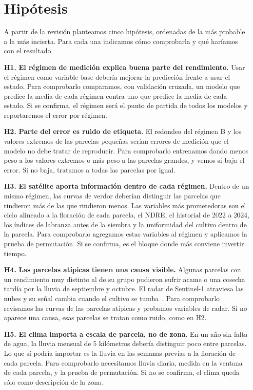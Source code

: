 \section{Hipótesis}\label{sec:hipotesis}
A partir de la revisión planteamos cinco hipótesis, ordenadas de la más probable a la más incierta. Para cada una
indicamos cómo comprobarla y qué haríamos con el resultado.

\textbf{H1. El régimen de medición explica buena parte del rendimiento.} Usar el régimen como variable base debería
mejorar la predicción frente a usar el estado. Para comprobarlo comparamos, con validación cruzada, un modelo que
predice la media de cada régimen contra uno que predice la media de cada estado. Si se confirma, el régimen será el
punto de partida de todos los modelos y reportaremos el error por régimen.

\textbf{H2. Parte del error es ruido de etiqueta.} El redondeo del régimen B y los valores extremos de las parcelas
pequeñas serían errores de medición que el modelo no debe tratar de reproducir. Para comprobarlo entrenamos dando
menos peso a los valores extremos o más peso a las parcelas grandes, y vemos si baja el error. Si no baja, tratamos a
todas las parcelas por igual.

\textbf{H3. El satélite aporta información dentro de cada régimen.} Dentro de un mismo régimen, las curvas de verdor
deberían distinguir las parcelas que rindieron más de las que rindieron menos. Las variables más prometedoras son el
ciclo alineado a la floración de cada parcela, el NDRE, el historial de 2022 a 2024, los índices de labranza antes de
la siembra y la uniformidad del cultivo dentro de la parcela. Para comprobarlo agregamos estas variables al régimen y
aplicamos la prueba de permutación. Si se confirma, es el bloque donde más conviene invertir tiempo.

\textbf{H4. Las parcelas atípicas tienen una causa visible.} Algunas parcelas con un rendimiento muy distinto al de su
grupo pudieron sufrir acame o una cosecha tardía por la lluvia de septiembre y octubre. El radar de Sentinel-1
atraviesa las nubes y su señal cambia cuando el cultivo se tumba~\cite{chauhan2020}. Para comprobarlo revisamos las
curvas de las parcelas atípicas y probamos variables de radar. Si no aparece una causa, esas parcelas se tratan como
ruido, como en H2.

\textbf{H5. El clima importa a escala de parcela, no de zona.} En un año sin falta de agua, la lluvia mensual de
5 kilómetros debería distinguir poco entre parcelas. Lo que sí podría importar es la lluvia en las semanas previas a
la floración de cada parcela. Para comprobarlo necesitamos lluvia diaria, medida en la ventana de cada parcela, y
la prueba de permutación. Si no se confirma, el clima queda sólo como descripción de la zona.
